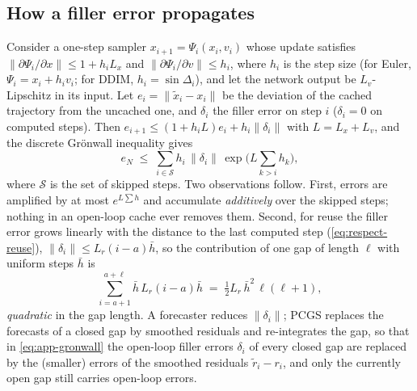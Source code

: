 \subsection{How a filler error propagates}\label{sec:app-gronwall}
Consider a one-step sampler $x_{i+1} = \Psi_i(x_i, v_i)$ whose update satisfies $\|\partial\Psi_i/\partial x\|\le 1+h_iL_x$ and $\|\partial\Psi_i/\partial v\|\le h_i$, where $h_i$ is the step size (for Euler, $\Psi_i = x_i + h_iv_i$; for DDIM, $h_i=\sin\Delta_i$), and let the network output be $L_v$-Lipschitz in its input. Let $e_i = \|\tilde x_i - x_i\|$ be the deviation of the cached trajectory from the uncached one, and $\delta_i$ the filler error on step $i$ ($\delta_i=0$ on computed steps). Then $e_{i+1}\le(1+h_iL)e_i + h_i\|\delta_i\|$ with $L = L_x+L_v$, and the discrete Grönwall inequality gives
\begin{equation}\label{eq:app-gronwall}
  e_N \;\le\; \sum_{i\in\mathcal S} h_i\,\|\delta_i\|\,\exp\Big(L\sum_{k>i}h_k\Big),
\end{equation}
where $\mathcal S$ is the set of skipped steps. Two observations follow. First, errors are amplified by at most $e^{L\sum h}$ and accumulate \emph{additively} over the skipped steps; nothing in an open-loop cache ever removes them. Second, for reuse the filler error grows linearly with the distance to the last computed step (\cref{eq:respect-reuse}), $\|\delta_i\|\le L_r (i-a)\bar h$, so the contribution of one gap of length $\ell$ with uniform steps $\bar h$ is
\begin{equation}
  \sum_{i=a+1}^{a+\ell}\bar h\,L_r(i-a)\bar h \;=\; \tfrac12 L_r\,\bar h^2\,\ell(\ell+1),
\end{equation}
\emph{quadratic} in the gap length. A forecaster reduces $\|\delta_i\|$; PCGS replaces the forecasts of a closed gap by smoothed residuals and re-integrates the gap, so that in \cref{eq:app-gronwall} the open-loop filler errors $\delta_i$ of every closed gap are replaced by the (smaller) errors of the smoothed residuals $\tilde r_i - r_i$, and only the currently open gap still carries open-loop errors.

